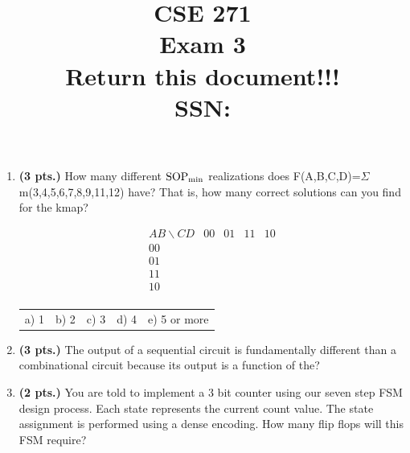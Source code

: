 \documentclass{article}
\begin{document}
\newcommand{\SOPmin}{${\rm SOP}_{\rm min} \ $}
\newcommand{\POSmin}{${\rm POS}_{\rm min} \ $}
\newcommand{\bs}{\backslash}
\newcommand{\x}{\addtocounter{enumi}{1} \theenumi}


\title{
\Huge{CSE 271}\\
\normalsize{Exam 3}\\
\normalsize{Return this document!!!}\\
SSN:}
\date{}

\maketitle{}

\begin{enumerate}
\item {\bf (3 pts.)} How many different \SOPmin realizations does 
F(A,B,C,D)=$\Sigma$m(3,4,5,6,7,8,9,11,12) have?  That is, how many correct
solutions can you find for the kmap?

$$ \begin{array} {c||c|c|c|c}
        AB \bs CD & 00 & 01 & 11 & 10 \\ \hline \hline
        00        &    &    &    &    \\ \hline
        01        &    &    &    &    \\ \hline
        11        &    &    &    &    \\ \hline
        10        &    &    &    &    \\
\end{array} $$ 

\begin{tabular}{p{0.75in}p{0.75in}p{0.75in}p{0.75in}p{0.75in}}
a) 1 & b) 2 & c) 3 & d) 4 & e) 5 or more \\
\end{tabular}

\item {\bf (3 pts.)} The output of a sequential circuit is fundamentally
different than a combinational circuit because its output is a function
of the?

\item {\bf (2 pts.)} You are told to implement a 3 bit counter using our seven
step FSM design process.  Each state represents the current count value.  The
state assignment is performed using a dense encoding. 
How many flip flops will this FSM require?


\end{enumerate}
\end{document}

